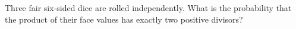 Three fair six-sided dice are rolled independently. What is the probability that the product of their face values has exactly two positive divisors?
